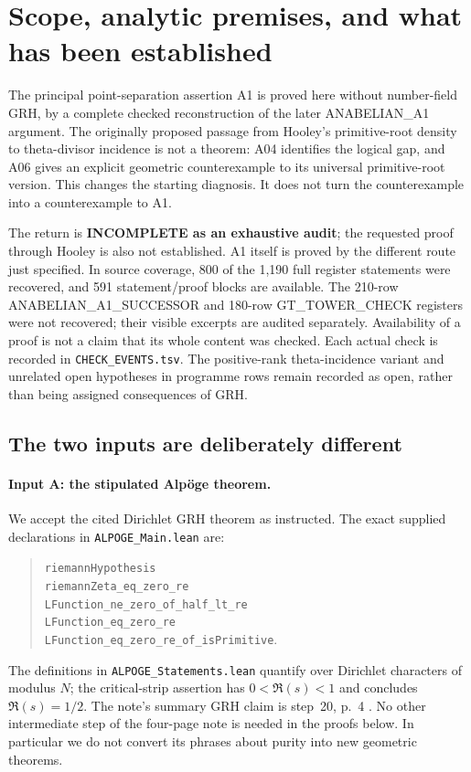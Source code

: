 \section{Scope, analytic premises, and what has been established}
\label{sec:premises}

The principal point-separation assertion A1 is proved here without
number-field GRH, by a complete checked reconstruction of the later
ANABELIAN\_A1 argument. The originally proposed passage from Hooley's
primitive-root density to theta-divisor incidence is not a theorem:
A04 identifies the logical gap, and A06 gives an explicit geometric
counterexample to its universal primitive-root version. This changes
the starting diagnosis. It does not turn the counterexample into a
counterexample to A1.

The return is \textbf{INCOMPLETE as an exhaustive audit}; the
requested proof through Hooley is also not established. A1 itself
is proved by the different route just specified. In source coverage,
800 of the 1,190 full register statements were recovered, and 591
statement/proof blocks are available. The 210-row
ANABELIAN\_A1\_SUCCESSOR and 180-row GT\_TOWER\_CHECK registers were not
recovered; their visible excerpts are audited separately. Availability
of a proof is not a claim that its whole content was checked. Each
actual check is recorded in \texttt{CHECK\_EVENTS.tsv}. The positive-rank
theta-incidence variant and unrelated open hypotheses in programme
rows remain recorded as open, rather than being assigned consequences
of GRH.

\subsection{The two inputs are deliberately different}

\paragraph{Input A: the stipulated Alp\"oge theorem.}
We accept the cited Dirichlet GRH theorem as instructed. The exact
supplied declarations in \texttt{ALPOGE\_Main.lean} are:
\begin{quote}\small\raggedright
\texttt{riemannHypothesis}\\
\texttt{riemannZeta\_eq\_zero\_re}\\
\texttt{LFunction\_ne\_zero\_of\_half\_lt\_re}\\
\texttt{LFunction\_eq\_zero\_re}\\
\texttt{LFunction\_eq\_zero\_re\_of\_isPrimitive}.
\end{quote}
The definitions in \texttt{ALPOGE\_Statements.lean} quantify over
Dirichlet characters of modulus $N$; the critical-strip assertion
has $0<\Re(s)<1$ and concludes $\Re(s)=1/2$.
The note's summary GRH claim is step~20, p.~4 \cite{Alpoge}.
No other intermediate step of the four-page note is needed in the
proofs below. In particular we do not convert its phrases about
purity into new geometric theorems.

